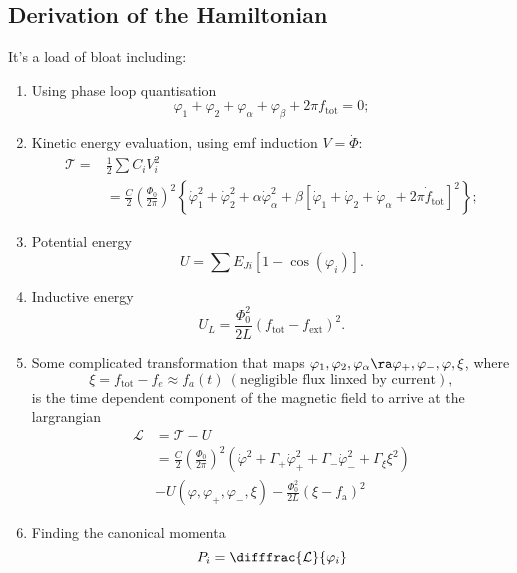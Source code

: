 \subsection{Derivation of the Hamiltonian}
It's a load of bloat including:
\begin{enumerate}
\item Using phase loop quantisation
  \begin{equation}\label{key}
    \varphi_1 + \varphi_2 + \varphi_\alpha + \varphi_\beta + 2\pi f_\text{tot} = 0;
  \end{equation}
\item Kinetic energy evaluation, using emf induction $ V = \dot{\Phi} $:
  \begin{equation}\label{key}
    \begin{aligned}
      \mathcal{T} = & \frac{1}{2}\sum C_iV_i^2\\
      &   =   \frac{C}{2}\left(\frac{\Phi_0}{2\pi}\right)^2\left\lbrace\dot{\varphi}^2_1    +   \dot{\varphi}^2_2   +
        \alpha\dot{\varphi}^2_\alpha    +     \beta\left[\dot{\varphi}_1    +    \dot{\varphi}_2    +     \dot{\varphi}_\alpha    +    2\pi
          \dot{f}_\text{tot}\right]^2\right\rbrace;
    \end{aligned}
  \end{equation}
\item Potential energy
  \begin{equation}\label{key}
    U = \sum E_{Ji}\left[1 - \cos(\varphi_i)\right].
  \end{equation}
\item Inductive energy
  \begin{equation}\label{key}
    U_L = \frac{\Phi_0^2}{2L}\left(f_\text{tot} - f_\text{ext}\right)^2.
  \end{equation}
\item Some complicated transformation that maps $ \varphi_1, \varphi_2, \varphi_\alpha \ra \varphi_+, \varphi_-, \varphi, \xi $, where
  \begin{equation}\label{key}
    \xi = f_\text{tot} - f_e \approx f_a(t)\ (\text{negligible flux linxed by current}),
  \end{equation}
  \noindent is the time dependent component of the magnetic field to arrive at the largrangian
  \begin{equation}\label{key}
    \begin{aligned}
      \mathcal{L} & = \mathcal{T} - U\\
      & =  \frac{C}{2}\left(\frac{\Phi_0}{2\pi}\right)^2\left(\dot{\varphi}^2 + \Gamma_+\dot{\varphi}_+^2 + \Gamma_-\dot{\varphi}_-^2 + \Gamma_\xi\xi^2\right)\\
      & - U(\varphi, \varphi_+, \varphi_-, \xi) - \frac{\Phi_0^2}{2L}\left(\xi - f_\text{a}\right)^2
    \end{aligned}
  \end{equation}
\item Finding the canonical momenta
  \begin{equation}\label{key}
    P_i = \difffrac{\mathcal{L}}{\varphi_i}
  \end{equation}
  	

\end{enumerate}
